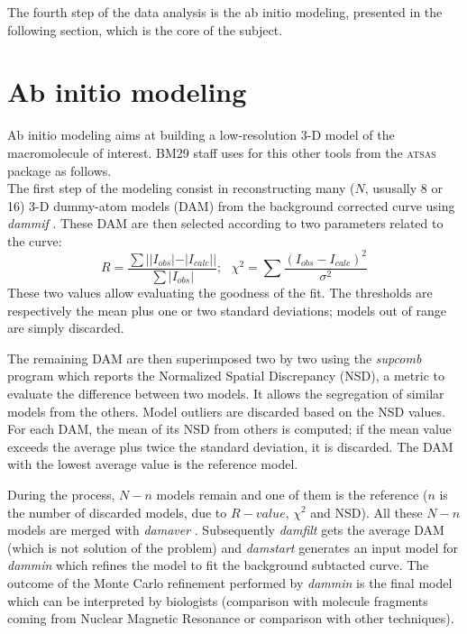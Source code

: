 \documentclass[a4paper, 11pt]{report}
\begin{document}
The fourth step of the data analysis is the ab initio modeling, 
presented in the following section, which is the core of the subject.

\section{Ab initio modeling}
\label{modeling}                           %

Ab initio modeling aims at building a low-resolution 3-D model of the 
macromolecule of interest. 
BM29 staff uses for this other tools from the \textsc{atsas} package 
as follows.\\

The first step of the modeling consist in reconstructing many ($N$, ususally 8
or 16) 3-D dummy-atom models (DAM) from the background corrected curve using 
\textit{dammif} \cite{dammif}. 
These DAM are then selected according to two parameters related to the 
curve: 
\[
R = \frac {\sum {||I_{obs}| - |I_{calc}||}}{\sum {|I_{obs}|}}; \ \ \ 
\chi^{2} = \sum {\frac {(I_{obs} - I_{calc})^{2}}{\sigma^{2}}}
\]
These two values allow evaluating the goodness of the fit. 
The thresholds are respectively the mean plus one or two standard 
deviations; models out of range are simply discarded.

The remaining DAM are then superimposed two by two using the 
\textit{supcomb} \cite{supcomb} program which reports the Normalized 
Spatial Discrepancy (NSD), a metric to evaluate the difference between 
two models. 
It allows the segregation of similar models from the others. 
Model outliers are discarded based on the NSD
values.
For each DAM, the mean of its NSD from others is computed; if the mean 
value exceeds the average plus twice the standard deviation, it is 
discarded. 
The DAM with the lowest average value is the reference model.

During the process, $N - n$ models remain and one of them is the 
reference ($n$ is the number of discarded models, due to $R-value$, 
$\chi^{2}$ and NSD). 
All these $N - n$ models are merged with \textit{damaver} 
\cite{damaver}. 
Subsequently \textit{damfilt} gets the average DAM (which is not solution of
the problem) and \textit{damstart} generates an input model for 
\textit{dammin} \cite{dammin} which refines the model to fit the 
background subtacted curve. 
The outcome of the Monte Carlo refinement performed by \textit{dammin} 
is the final model which can be interpreted by biologists (comparison 
with molecule fragments coming from Nuclear Magnetic Resonance or 
comparison with other techniques).
\end{document}
